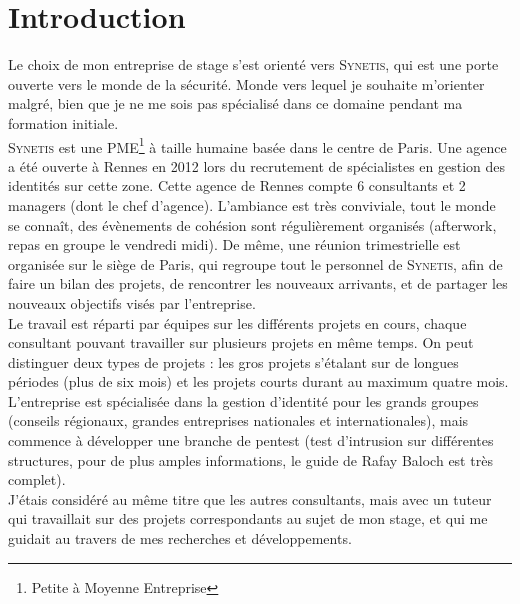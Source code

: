 \section*{Introduction} %
\label{intro}

%
%
%
Le choix de mon entreprise de stage s'est orienté vers \textsc{Synetis}, qui est une porte ouverte vers le monde de la sécurité. Monde vers lequel je souhaite m'orienter malgré, bien que je ne me sois pas spécialisé dans ce domaine pendant ma formation initiale.\\
\textsc{Synetis} est une PME\footnote{Petite à Moyenne Entreprise} à taille humaine basée dans le centre de Paris. Une agence a été ouverte à Rennes en 2012 lors du recrutement de spécialistes en gestion des identités sur cette zone. Cette agence de Rennes compte 6 consultants et 2 managers (dont le chef d'agence). L'ambiance est très conviviale, tout le monde se connaît, des évènements de cohésion sont régulièrement organisés (afterwork, repas en groupe le vendredi midi). De même, une réunion trimestrielle est organisée sur le siège de Paris, qui regroupe tout le personnel de \textsc{Synetis}, afin de faire un bilan des projets, de rencontrer les nouveaux arrivants, et de partager les nouveaux objectifs visés par l'entreprise.\\
Le travail est réparti par équipes sur les différents projets en cours, chaque consultant pouvant travailler sur plusieurs projets en même temps. On peut distinguer deux types de projets : les gros projets s'étalant sur de longues périodes (plus de six mois) et les projets courts durant au maximum quatre mois. L'entreprise est spécialisée dans la gestion d'identité pour les grands groupes (conseils régionaux, grandes entreprises nationales et internationales), mais commence à développer une branche de pentest (test d'intrusion sur différentes structures, pour de plus amples informations, le guide de Rafay Baloch \cite{rba} est très complet).\\
J'étais considéré au même titre que les autres consultants, mais avec un tuteur qui travaillait sur des projets correspondants au sujet de mon stage, et qui me guidait au travers de mes recherches et développements.\\
